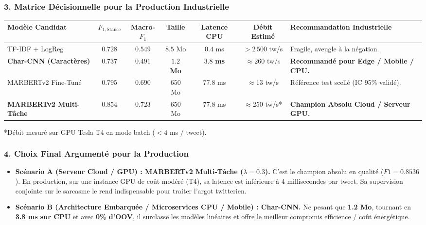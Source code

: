 \documentclass[11pt,a4paper]{article}
\begin{document}
\subsubsection*{3. Matrice Décisionnelle pour la Production Industrielle}
\begin{table}[htbp]
\centering
\small
\begin{tabularx}{\textwidth}{lcccccX}
\toprule
\textbf{Modèle Candidat} & \textbf{$F_{1,\text{Stance}}$} & \textbf{Macro-$F_1$} & \textbf{Taille} & \textbf{Latence CPU} & \textbf{Débit Estimé} & \textbf{Recommandation Industrielle} \\
\midrule
TF-IDF + LogReg & $0.728$ & $0.549$ & $8.5$ Mo & $\mathbf{0.4}$ ms & $> 2\,500$ tw/s & Fragile, aveugle à la négation. \\
\textbf{Char-CNN (Caractères)} & $\mathbf{0.737}$ & $\mathbf{0.491}$ & $\mathbf{1.2}$ \textbf{Mo} & $\mathbf{3.8}$ \textbf{ms} & $\approx 260$ tw/s & \textbf{Recommandé pour Edge / Mobile / CPU.} \\
MARBERTv2 Fine-Tuné & $0.795$ & $0.690$ & $650$ Mo & $77.8$ ms & $\approx 13$ tw/s & Référence test scellé (IC 95\% validé). \\
\textbf{MARBERTv2 Multi-Tâche} & $\mathbf{0.854}$ & $\mathbf{0.723}$ & $650$ Mo & $77.8$ ms & $\approx 250$ tw/s* & \textbf{Champion Absolu Cloud / Serveur GPU.} \\
\bottomrule
\end{tabularx}
\footnotesize{*Débit mesuré sur GPU Tesla T4 en mode batch ($< 4$ ms / tweet).}
\end{table}

\subsubsection*{4. Choix Final Argumenté pour la Production}
\begin{itemize}[leftmargin=*]
    \item \textbf{Scénario A (Serveur Cloud / GPU) : MARBERTv2 Multi-Tâche ($\lambda = 0.3$).}  
    C'est le champion absolu en qualité ($F1 = \mathbf{0.8536}$). En production, sur une instance GPU de coût modéré (T4), sa latence est inférieure à 4 millisecondes par tweet. Sa supervision conjointe sur le sarcasme le rend indispensable pour traiter l'argot twitterien.
    \item \textbf{Scénario B (Architecture Embarquée / Microservices CPU / Mobile) : Char-CNN.}  
    Ne pesant que \textbf{1.2 Mo}, tournant en \textbf{3.8 ms sur CPU} et avec \textbf{0\% d'OOV}, il surclasse les modèles linéaires et offre le meilleur compromis efficience / coût énergétique.
\end{itemize}
\end{document}
